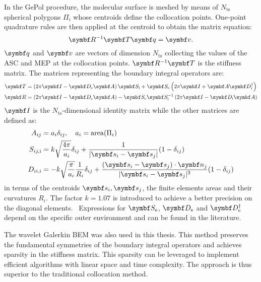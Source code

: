 In the GePol procedure, the molecular surface is meshed by means of
$N_\mathrm{ts}$ spherical polygons $\Pi_i$ whose centroids define the
collocation points. One-point quadrature rules are then applied at the
centroid to obtain the matrix equation:
\begin{equation}
 \mat{R}^{-1}\mat{T} \vect{q}
  =
  \vect{v}.
\end{equation}
$\vect{q}$ and $\vect{v}$ are vectors of dimension $N_\mathrm{ts}$
collecting the values of the \acrshort{ASC} and \gls{MEP}
at the collocation points. $\mat{R}^{-1}\mat{T}$ is the stiffness
matrix.
The matrices representing the boundary integral operators are:
\begin{align}
  \mat{T} &=
  \left(2\pi\mat{I} - \mat{D}_\mathrm{e}\mat{A}\right)\mat{S}_\mathrm{i}
  +\mat{S}_\mathrm{e}\left(2\pi\mat{I} +
  \mat{A}\mat{D}_\mathrm{i}^\dagger\right) \\
  \mat{R} &=
  \left(2\pi\mat{I} - \mat{D}_\mathrm{e}\mat{A}\right) -
  \mat{S}_\mathrm{e}\mat{S}^{-1}_\mathrm{i}\left(2\pi\mat{I}-\mat{D}_\mathrm{i}\mat{A}\right)
\end{align}
$\mat{I}$ is the $N_\mathrm{ts}$-dimensional identity matrix while the
other matrices are defined as:
\begin{subequations}
  \begin{align}
    A_{ij} &= a_i\delta_{ij}, \quad a_i = \mathrm{area}(\Pi_i) \\
    S_{ij, \mathrm{i}} &=
    k\sqrt{\frac{4\pi}{a_i}}\delta_{ij} +
    \frac{1}{|\vect{s}_i-\vect{s}_j|}(1-\delta_{ij}) \\
    D_{ii, \mathrm{i}} &=
    -k\sqrt{\frac{\pi}{a_i}}\frac{1}{R_i}\delta_{ij}
    + \frac{(\vect{s}_i-\vect{s}_j)\cdot\vect{n}_j}{|\vect{s}_i-\vect{s}_j|^3}(1-\delta_{ij})
  \end{align}
\end{subequations}
in terms of the centroids $\vect{s}_i, \vect{s}_j$, the finite elements
areas and their curvatures $R_i$.
The factor $k=1.07$ is introduced to achieve a better precision on the
diagonal elements.~\autocite{Tomasi2005-vm}
Expressions for $\mat{S}_\mathrm{e}$, $\mat{D}_\mathrm{e}$ and
$\mat{D}^\dagger_\mathrm{e}$ depend on the specific outer environment
and can be found in the literature.~\autocite{Corni2002-dr, Frediani2004-er,
Tomasi2005-vm, Delgado2013-kd, DiRemigio2016-nn}

The wavelet Galerkin \acrshort{BEM} was also used in this thesis. This method
preserves the fundamental symmetries of the boundary integral operators
and achieves sparsity in the stiffness matrix.
This sparsity can be leveraged to implement efficient algorithms with
linear space and time complexity. The approach is thus superior
to the traditional collocation method.

